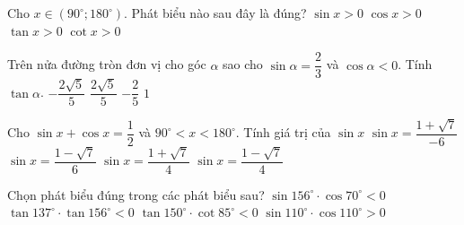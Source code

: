 \begin{ex}
	Cho $x\in\left(90^\circ;180^\circ\right)$. Phát biểu nào sau đây là đúng?
	\choice
	{\True $\sin x>0$}
	{$\cos x>0$}
	{$\tan x>0$}
	{$\cot x>0$}
\end{ex}
\begin{ex}
	Trên nửa đường tròn đơn vị cho góc $\alpha$ sao cho $\sin\alpha=\dfrac{2}{3}$ và $\cos\alpha<0$. Tính $\tan\alpha$.
	\choice
	{\True $-\dfrac{2\sqrt{5}}{5}$}
	{$\dfrac{2\sqrt{5}}{5}$}
	{$-\dfrac{2}{5}$}
	{$1$}
\end{ex}
\begin{ex}
	Cho $\sin x+\cos x=\dfrac{1}{2}$ và $90^\circ<x<180^\circ$. Tính giá trị của $\sin x$
	\choice
	{$\sin x=\dfrac{1+\sqrt{7}}{-6}$}
	{$\sin x=\dfrac{1-\sqrt{7}}{6}$}
	{\True $\sin x=\dfrac{1+\sqrt{7}}{4}$}
	{$\sin x=\dfrac{1-\sqrt{7}}{4}$}
\end{ex}
\begin{ex}
	Chọn phát biểu đúng trong các phát biểu sau?
	\choice
	{$\sin 156^\circ\cdot\cos70^\circ<0$}
	{$\tan 137^\circ\cdot\tan 156^\circ<0$}
	{\True $\tan150^\circ\cdot\cot85^\circ<0$}
	{$\sin 110^\circ\cdot\cos 110^\circ>0$}
\end{ex}
